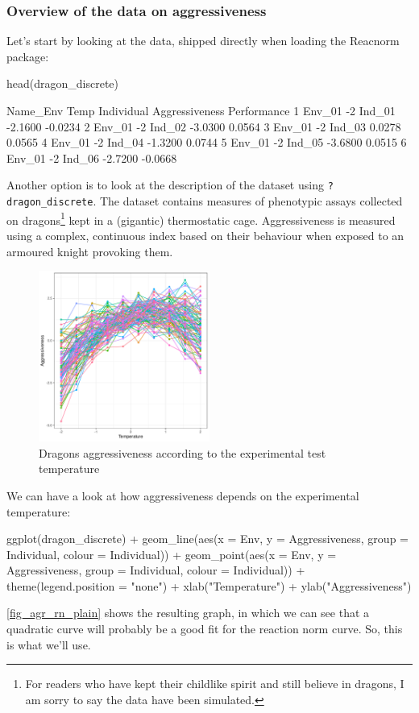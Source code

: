 \documentclass[a4paper,12pt,twoside]{article}
\begin{document}
\subsubsection{Overview of the data on aggressiveness}

Let's start by looking at the data, shipped directly when loading the Reacnorm package:
\begin{Rinput}
head(dragon_discrete)
\end{Rinput}
\begin{Routput}
  Name_Env Temp Individual Aggressiveness Performance
1   Env_01   -2     Ind_01        -2.1600     -0.0234
2   Env_01   -2     Ind_02        -3.0300      0.0564
3   Env_01   -2     Ind_03         0.0278      0.0565
4   Env_01   -2     Ind_04        -1.3200      0.0744
5   Env_01   -2     Ind_05        -3.6800      0.0515
6   Env_01   -2     Ind_06        -2.7200     -0.0668
\end{Routput}
Another option is to look at the description of the dataset using \texttt{?dragon\_discrete}.
The dataset contains measures of phenotypic assays collected on dragons\footnote{For readers who have kept their childlike spirit and still believe in dragons, I am sorry to say the data have been simulated.} kept in a (gigantic) thermostatic cage. Aggressiveness is measured using a complex, continuous index based on their behaviour when exposed to an armoured knight provoking them.

\begin{figure}[b!h!t!]
  \includegraphics[width = 0.5\textwidth]{Aggressiveness_discrete.pdf}
  \caption{Dragons aggressiveness according to the experimental test temperature}
  \label{fig_agr_rn_plain}
\end{figure}

We can have a look at how aggressiveness depends on the experimental temperature:
\begin{Rinput}
ggplot(dragon_discrete) +
    geom_line(aes(x = Env, y = Aggressiveness, group = Individual, colour = Individual)) +
    geom_point(aes(x = Env, y = Aggressiveness, group = Individual, colour = Individual)) +
    theme(legend.position = "none") +
    xlab("Temperature") + ylab("Aggressiveness")
\end{Rinput}
\autoref{fig_agr_rn_plain} shows the resulting graph, in which we can see that a quadratic curve will probably be a good fit for the reaction norm curve. So, this is what we'll use.
\end{document}
